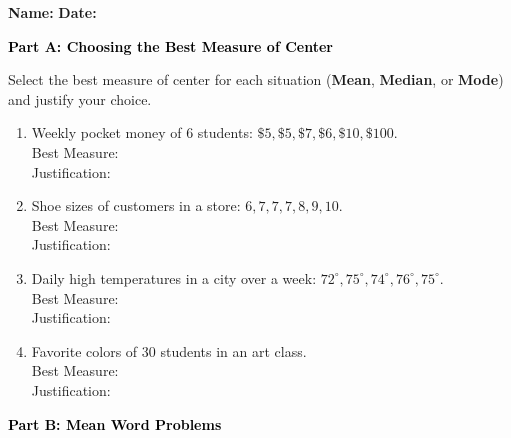 \documentclass[12pt, letterpaper, fleqn]{article}
\newcommand{\blanklong}{\underline{\hspace{6.5cm}}}
\newcommand{\blankshorter}{\underline{\hspace{1.5cm}}}
\begin{document}
\textbf{Name:} \underline{\hspace{5cm}}
\hfill
\textbf{Date:} \underline{\hspace{3cm}}\\

\begin{tcolorbox}[colback=black!10]
    \large\textcolor{black}{\textbf{Part A: Choosing the Best Measure of Center}}
\end{tcolorbox}

\vspace{3mm}

\noindent
Select the best measure of center for each situation (\textbf{Mean}, \textbf{Median}, or \textbf{Mode}) and justify your choice.

\vspace{5mm}

\begin{enumerate}[itemsep=2.0cm, leftmargin=0.6cm]
\item Weekly pocket money of 6 students: $\$5, \$5, \$7, \$6, \$10, \$100$. \\
Best Measure: \blankshorter \\
Justification: \blanklong

\item Shoe sizes of customers in a store: $6, 7, 7, 7, 8, 9, 10$. \\
Best Measure: \blankshorter \\
Justification: \blanklong

\item Daily high temperatures in a city over a week: $72^\circ, 75^\circ, 74^\circ, 76^\circ, 75^\circ$. \\
Best Measure: \blankshorter \\
Justification: \blanklong

\item Favorite colors of 30 students in an art class. \\
Best Measure: \blankshorter \\
Justification: \blanklong
\end{enumerate}

\newpage

\begin{tcolorbox}[colback=black!10]
    \large\textcolor{black}{\textbf{Part B: Mean Word Problems}}
\end{tcolorbox}
\end{document}
